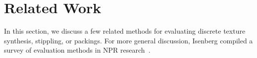 \section{Related Work}


\newtext
{
In this section, we discuss a few related methods for evaluating discrete texture synthesis,
stippling, or packings.
For more general discussion, Isenberg compiled a survey of evaluation methods in NPR research~\cite{Isenberg2013}.
}





